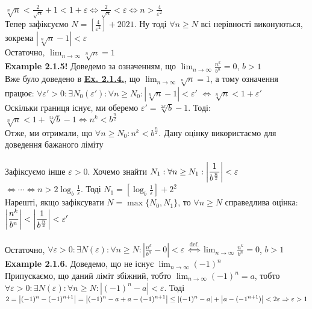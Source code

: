 \documentclass[a4paper, 14pt]{extarticle}
\def\bigline{\vspace{5mm}\\}
\def\bigline{\vspace{5mm}\\}
\def\limitdef#1#2#3#4#5{$\displaystyle \forall #1 > 0: \exists #2(#1): \forall #3 \geq #2: \left|#4 - #5\right| < #1$}
\begin{document}
	$\displaystyle \sqrt[n]{n} < \frac{2}{\sqrt{n}} + 1 < 1 + \varepsilon \iff \frac{2}{\sqrt{n}} < \varepsilon \iff n > \frac{4}{\varepsilon^2}$\\
	Тепер зафіксуємо $\displaystyle N = \left[\frac{4}{\varepsilon^2} \right] + 2021$. Ну тоді $\forall n \geq N$ всі нерівності виконуються, зокрема $\left|\sqrt[n]{n}-1  \right|<\varepsilon$\\
	Остаточно, $\displaystyle\lim_{n \to \infty} \sqrt[n]{n}=1$
	\bigline
	\textbf{Example 2.1.5!} Доведемо за означенням, що $\displaystyle\lim_{n \to \infty} \frac{n^k}{b^n} = 0$, $b>1$\\
	Вже було доведено в \hyperlink{ex2.1.4.}{\textbf{Ex. 2.1.4.}}, що $\displaystyle\lim_{n \to \infty} \sqrt[n]{n}=1$, а тому означення працює:
	\limitdef{\varepsilon'}{N_0}{n}{\sqrt[n]{n}}{1} $\iff \sqrt[n]{n}<1+\varepsilon'$\\
	Оскільки границя існує, ми оберемо $\displaystyle \varepsilon' = \sqrt[2k]{b}-1$. Тоді:\\
	$\displaystyle \sqrt[n]{n} < 1 + \sqrt[2k]{b}-1 \iff n^k < b^{\frac{n}{2}}$\\
	Отже, ми отримали, що $\forall n \geq N_0: n^k < b^{\frac{n}{2}}$. Дану оцінку використаємо для доведення бажаного ліміту\\
	\\
	Зафіксуємо інше $\varepsilon>0$. Хочемо знайти $N_1: \forall n \geq N_1: \displaystyle \abs{\frac{1}{b^{\frac{n}{2}}}} < \varepsilon$\\
	$\displaystyle \iff \cdots \iff n>2 \log_{b} \frac{1}{\varepsilon}$. Тоді $\displaystyle N_1 = \left[\log_{b} \frac{1}{\varepsilon} \right] + 2^2$\\
	Нарешті, якщо зафіксувати $N=\max\{N_0, N_1\}$, то $\forall n \geq N$ справедлива оцінка:\\
	$\displaystyle \abs{\frac{n^k}{b^n}} < \abs{\frac{1}{b^{\frac{n}{2}}}} < \varepsilon'$\\
	\\
	Остаточно, \limitdef{\varepsilon}{N}{n}{\frac{n^k}{b^n}}{0} $\overset{\textrm{def.}}{\iff} \displaystyle\lim_{n \to \infty} \frac{n^k}{b^n} = 0$, $b>1$
	\bigline
	\hypertarget{ex2.1.6.}{\textbf{Example 2.1.6.}} Доведемо, що не існує $\displaystyle \lim_{n \to \infty} (-1)^n$\\
	Припускаємо, що даний ліміт збіжний, тобто $\displaystyle \lim_{n \to \infty} (-1)^n = a$, тобто\\
	\limitdef{\varepsilon}{N}{n}{(-1)^n}{a}. Тоді\\
	$\displaystyle 2=\abs{(-1)^n-(-1)^{n+1}}=\abs{(-1)^n-a+a-(-1)^{n+1}} \leq \abs{(-1)^n-a}+\abs{a-(-1^{n+1})} < 2\varepsilon \Rightarrow \varepsilon > 1$\\
\end{document}

